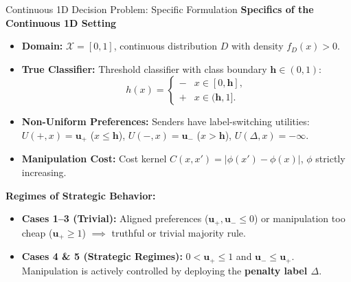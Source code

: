 \documentclass[aspectratio=169, 11pt, t, xcolor=table]{beamer}
\newcommand{\cg}[1]{\mathcal{#1}}
\newcommand{\hh}{\mathbf{h}}
\newcommand{\um}{\mathbf{u_-}}
\newcommand{\up}{\mathbf{u_+}}
\newcommand{\minus}{\mathbf{-}}
\newcommand{\plus}{\mathbf{+}}
\begin{document}
\begin{frame}{Continuous 1D Decision Problem: Specific Formulation}
\small
\textbf{Specifics of the Continuous 1D Setting}
\begin{itemize}\itemsep=1.5pt
  \item \textbf{Domain:} $\cg{X} = [0, 1]$, continuous distribution $D$ with density $f_D(x) > 0$.
  \item \textbf{True Classifier:} Threshold classifier with class boundary $\hh \in (0, 1)$:
    \[
      h(x) = \begin{cases} \minus & x \in [0, \hh], \\ \plus & x \in (\hh, 1]. \end{cases}
    \]
  \item \textbf{Non-Uniform Preferences:} Senders have label-switching utilities:
    $U(\plus, x) = \up$ ($x \le \hh$), $U(\minus, x) = \um$ ($x > \hh$), $U(\Delta, x) = -\infty$.
  \item \textbf{Manipulation Cost:} Cost kernel $C(x, x') = |\phi(x') - \phi(x)|$, $\phi$ strictly increasing.
\end{itemize}

\par\vspace{0.3em}
\textbf{Regimes of Strategic Behavior:}
\begin{itemize}\itemsep=1.5pt
  \item \textbf{Cases 1--3 (Trivial):} Aligned preferences ($\up, \um \le 0$) or manipulation too cheap ($\up \ge 1$) $\implies$ truthful or trivial majority rule.
  \item \textbf{Cases 4 \& 5 (Strategic Regimes):} $0 < \up \le 1$ and $\um \le \up$.
    Manipulation is actively controlled by deploying the \textbf{penalty label $\Delta$}.
\end{itemize}
\end{frame}
\end{document}
